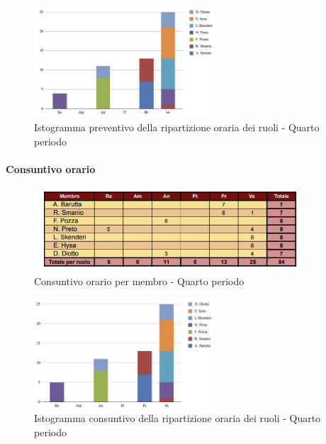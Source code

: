 \vspace{0.6cm}

\begin{figure}[H]
    \centering
    \includegraphics[width=0.6\textwidth]{../Images/graficoPrev4.png}
    \caption{Istogramma preventivo della ripartizione oraria dei ruoli - Quarto periodo}
    \label{fig:Preventivo_ripartizione_oraria_4}
\end{figure}

\paragraph{Consuntivo orario} 

\begin{figure}[H]
    \centering
    \includegraphics[width=0.9\textwidth]{../Images/tabCons4.png}
    \caption{Consuntivo orario per membro - Quarto periodo}
    \label{fig:Constuntivo_orario_4}
\end{figure}

\vspace{0.4cm}

\begin{figure}[H]
    \centering
    \includegraphics[width=0.6\textwidth]{../Images/graficoCons4.png}
    \caption{Istogramma consuntivo della ripartizione oraria dei ruoli - Quarto periodo}
    \label{fig:Consuntivo_ripartizione_oraria_4}
\end{figure}

